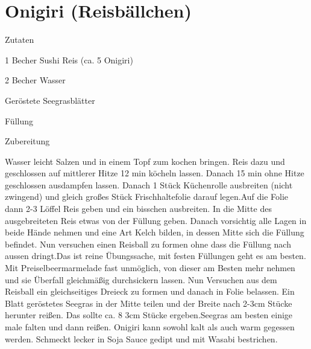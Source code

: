 \chapter*{Onigiri (Reisbällchen)}
\begin{multicols}{2}
 {\Large Zutaten}
 \begin{Zutaten}
		\item 1 Becher Sushi Reis (ca. 5 Onigiri)
		\item 2 Becher Wasser
		\item Geröstete Seegrasblätter
		\item Füllung
		
\end{Zutaten}
\columnbreak
\end{multicols}

{\Large Zubereitung} \newline
\begin{addmargin}[1cm]{0cm}
	Wasser leicht Salzen und in einem Topf zum kochen bringen. Reis dazu und geschlossen auf mittlerer
	Hitze 12 min köcheln lassen. Danach 15 min ohne Hitze geschlossen ausdampfen lassen.\newline
	Danach 1 Stück Küchenrolle ausbreiten (nicht zwingend) und gleich großes Stück Frischhaltefolie
	darauf legen.\newline Auf die Folie dann 2-3 Löffel Reis geben und ein bisschen ausbreiten. In die Mitte des
	ausgebreiteten Reis etwas von der Füllung geben.\newline
	Danach vorsichtig alle Lagen in beide Hände nehmen und eine Art Kelch bilden, in dessen Mitte sich
	die Füllung befindet. Nun versuchen einen Reisball zu formen ohne dass die Füllung nach aussen
	dringt.\newline Das ist reine Übungssache, mit festen Füllungen geht es am besten. Mit Preiselbeermarmelade
	fast unmöglich, von dieser am Besten mehr nehmen und sie Überfall gleichmäßig durchsickern lassen.\newline\newline
	Nun Versuchen aus dem Reisball ein gleichseitiges Dreieck zu formen und danach in Folie belassen.\newline
	Ein Blatt geröstetes Seegras in der Mitte teilen und der Breite nach 2-3cm Stücke herunter
	reißen. Das sollte ca. 8
	3cm Stücke ergeben.\newline Seegras am besten einige male falten und dann reißen.\newline
	Onigiri kann sowohl kalt als auch warm gegessen werden. Schmeckt lecker in Soja Sauce gedipt und mit
	Wasabi bestrichen.
	
	
	
	
	
\end{addmargin}
